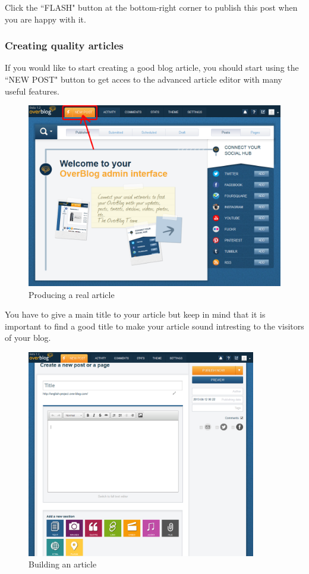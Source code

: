 \documentclass[a4paper,10pt]{article}
\begin{document}
Click the ``FLASH" button at the bottom-right corner to publish this post when you are happy with it. 

\newpage
\subsubsection{Creating quality articles}

If you would like to start creating a good blog article, you should start using the ``NEW POST" button to get acces to the advanced article editor with many useful features. 

\begin{figure}[H]
    \center
	\includegraphics[width=12cm]{Images/newpostbutton001.png}
    \caption{Producing a real article}
\end{figure}

You have to give a main title to your article but keep in mind that it is important to find a good title to make your article sound intresting to the visitors of your blog. 

\begin{figure}[H]
    \center
	\includegraphics[width=10cm]{Images/article001.png}
    \caption{Building an article}
\end{figure}
\end{document}
